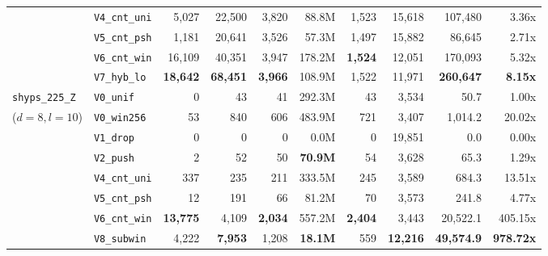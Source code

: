 \documentclass[12pt]{article}
\theoremstyle{definition}
\newcommand{\ttt}[1]{\texttt{#1}}
\begin{document}
\begin{table}[htbp]
\begin{tabular}{@{}llrrrrrrrr@{}}
 & \ttt{V4\_cnt\_uni} & 5,027 & 22,500 & 3,820 & 88.8M & 1,523 & 15,618 & 107,480 & 3.36x \\
 & \ttt{V5\_cnt\_psh} & 1,181 & 20,641 & 3,526 & 57.3M & 1,497 & 15,882 & 86,645 & 2.71x \\
 & \ttt{V6\_cnt\_win} & 16,109 & 40,351 & 3,947 & 178.2M & \textbf{1,524} & 12,051 & 170,093 & 5.32x \\
 & \ttt{V7\_hyb\_lo} & \textbf{18,642} & \textbf{68,451} & \textbf{3,966} & 108.9M & 1,522 & 11,971 &
   \textbf{260,647} & \textbf{8.15x} \\
\midrule
\ttt{shyps\_225\_Z} & \ttt{V0\_unif} & 0 & 43 & 41 & 292.3M & 43 & 3,534 & 50.7 & 1.00x \\
($d = 8, l = 10$) & \ttt{V0\_win256} & 53 & 840 & 606 & 483.9M & 721 & 3,407 & 1,014.2 & 20.02x \\
 & \ttt{V1\_drop} & 0 & 0 & 0 & 0.0M & 0 & 19,851 & 0.0 & 0.00x \\
 & \ttt{V2\_push} & 2 & 52 & 50 & \textbf{70.9M} & 54 & 3,628 & 65.3 & 1.29x \\
 & \ttt{V4\_cnt\_uni} & 337 & 235 & 211 & 333.5M & 245 & 3,589 & 684.3 & 13.51x \\
 & \ttt{V5\_cnt\_psh} & 12 & 191 & 66 & 81.2M & 70 & 3,573 & 241.8 & 4.77x \\
 & \ttt{V6\_cnt\_win} & \textbf{13,775} & 4,109 & \textbf{2,034} & 557.2M & \textbf{2,404} & 3,443 & 20,522.1 &
   405.15x \\
 & \ttt{V8\_subwin} & 4,222 & \textbf{7,953} & 1,208 & \textbf{18.1M} & 559 & \textbf{12,216} & \textbf{49,574.9} &
   \textbf{978.72x} \\
\bottomrule
\end{tabular}
\end{table}
\end{document}
